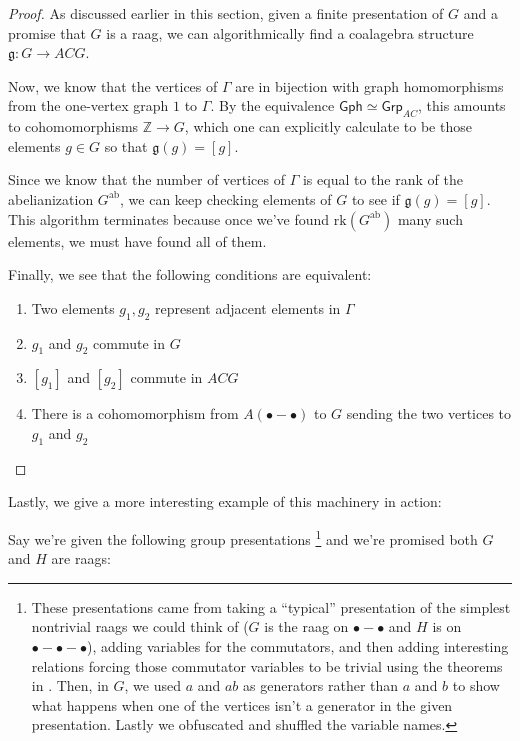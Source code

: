 \documentclass[microtype]{gtpart}
\theoremstyle{definition}
\theoremstyle{theorem}
\newcommand*{\catFont}[1]{\mathsf{#1}}
\newcommand{\Grp}{\catFont{Grp}}
\begin{document}
\begin{proof}
  As discussed earlier in this section, given a finite presentation of $G$ 
  and a promise that $G$ is a raag, we can algorithmically find a coalagebra 
  structure $\mathfrak{g} : G \to ACG$.

  Now, we know that the vertices of $\Gamma$ are in bijection with 
  graph homomorphisms from the one-vertex graph $1$ to $\Gamma$. 
  By the equivalence $\mathsf{Gph} \simeq \Grp_{AC}$, this amounts 
  to cohomomorphisms $\mathbb{Z} \to G$, which one can explicitly 
  calculate to be those elements $g \in G$ so that $\mathfrak{g}(g) = [g]$.

  Since we know that the number of vertices of $\Gamma$ is equal to the 
  rank of the abelianization $G^\text{ab}$, we can keep checking elements 
  of $G$ to see if $\mathfrak{g}(g) = [g]$. This algorithm terminates 
  because once we've found $\text{rk}(G^\text{ab})$ many such elements, 
  we must have found all of them.

  Finally, we see that the following conditions are equivalent:
  \begin{enumerate}
    \item Two elements $g_1, g_2$ represent adjacent elements in $\Gamma$ 
    \item $g_1$ and $g_2$ commute in $G$
    \item $[g_1]$ and $[g_2]$ commute in $ACG$
    \item There is a cohomomorphism from $A(\bullet - \bullet)$ to $G$ 
      sending the two vertices to $g_1$ and $g_2$
  \end{enumerate}
\end{proof}

\bigskip

Lastly, we give a more interesting example of this machinery in action:

Say we're given the following group presentations%
\footnote{These presentations came from taking a ``typical'' 
presentation of the simplest nontrivial raags we could think of 
($G$ is the raag on $\bullet - \bullet$ and $H$ is on 
$\bullet - \bullet - \bullet$), adding variables for 
the commutators, and then adding interesting relations forcing those 
commutator variables to be trivial using the theorems in 
\cite{millerPresentationsTrivialGroup1999}. Then, in $G$, 
we used $a$ and $ab$ as generators rather than $a$ and $b$ to show 
what happens when one of the vertices isn't a generator in the given 
presentation. Lastly we obfuscated and shuffled the variable names.
}
and we're promised both $G$ and $H$ are raags:
\end{document}
